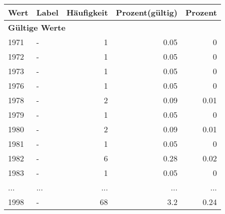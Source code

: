      \begin{longtable}{lXrrr}
     \toprule
     \textbf{Wert} & \textbf{Label} & \textbf{Häufigkeit} & \textbf{Prozent(gültig)} & \textbf{Prozent} \\
     \endhead
     \midrule
     \multicolumn{5}{l}{\textbf{Gültige Werte}}\\
        1971 & \multicolumn{1}{X}{-} & %
          \num{1} &
          \num[round-mode=places,round-precision=2]{0.05} &
          \num[round-mode=places,round-precision=2]{0} \\
        1972 & \multicolumn{1}{X}{-} & %
          \num{1} &
          \num[round-mode=places,round-precision=2]{0.05} &
          \num[round-mode=places,round-precision=2]{0} \\
        1973 & \multicolumn{1}{X}{-} & %
          \num{1} &
          \num[round-mode=places,round-precision=2]{0.05} &
          \num[round-mode=places,round-precision=2]{0} \\
        1976 & \multicolumn{1}{X}{-} & %
          \num{1} &
          \num[round-mode=places,round-precision=2]{0.05} &
          \num[round-mode=places,round-precision=2]{0} \\
        1978 & \multicolumn{1}{X}{-} & %
          \num{2} &
          \num[round-mode=places,round-precision=2]{0.09} &
          \num[round-mode=places,round-precision=2]{0.01} \\
        1979 & \multicolumn{1}{X}{-} & %
          \num{1} &
          \num[round-mode=places,round-precision=2]{0.05} &
          \num[round-mode=places,round-precision=2]{0} \\
        1980 & \multicolumn{1}{X}{-} & %
          \num{2} &
          \num[round-mode=places,round-precision=2]{0.09} &
          \num[round-mode=places,round-precision=2]{0.01} \\
        1981 & \multicolumn{1}{X}{-} & %
          \num{1} &
          \num[round-mode=places,round-precision=2]{0.05} &
          \num[round-mode=places,round-precision=2]{0} \\
        1982 & \multicolumn{1}{X}{-} & %
          \num{6} &
          \num[round-mode=places,round-precision=2]{0.28} &
          \num[round-mode=places,round-precision=2]{0.02} \\
        1983 & \multicolumn{1}{X}{-} & %
          \num{1} &
          \num[round-mode=places,round-precision=2]{0.05} &
          \num[round-mode=places,round-precision=2]{0} \\
       ... & ... & ... & ... & ... \\
        1998 & \multicolumn{1}{X}{-} & %
          \num{68} &
          \num[round-mode=places,round-precision=2]{3.2} &
          \num[round-mode=places,round-precision=2]{0.24} \\


\end{longtable}
